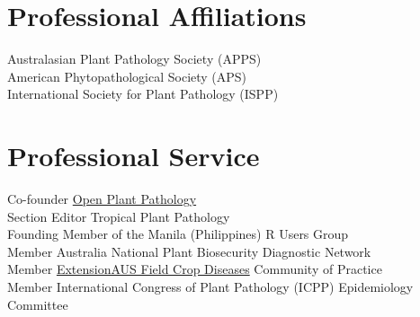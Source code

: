 
\section*{Professional Affiliations}
  Australasian Plant Pathology Society (APPS)\\[3 mm]
  American Phytopathological Society (APS)\\[3 mm]
  International Society for Plant Pathology (ISPP)\\

\section*{Professional Service}
  Co-founder \href{https://www.openplantpathology.org}{Open Plant Pathology}\\[3 mm]
  Section Editor Tropical Plant Pathology\\[3 mm]
  Founding Member of the Manila (Philippines) R Users Group\\[3 mm]
  Member Australia National Plant Biosecurity Diagnostic Network\\[3 mm]
  Member \href{http://extensionaus.com.au/field-crop-diseases/}{ExtensionAUS Field Crop Diseases} Community of Practice\\[3 mm]
  Member International Congress of Plant Pathology (ICPP) Epidemiology Committee\\
